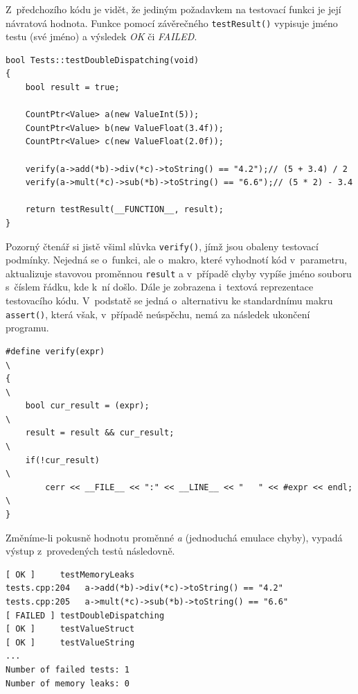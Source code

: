 \documentclass[11pt,twoside,a4paper]{book}
\begin{document}
Z~předchozího kódu je vidět, že jediným požadavkem na testovací funkci je její návratová hodnota. Funkce pomocí závěrečného \texttt{testResult()} vypisuje jméno testu (své jméno) a výsledek \textit{OK} či \textit{FAILED}.

\begin{verbatim}
bool Tests::testDoubleDispatching(void)
{
    bool result = true;

    CountPtr<Value> a(new ValueInt(5));
    CountPtr<Value> b(new ValueFloat(3.4f));
    CountPtr<Value> c(new ValueFloat(2.0f));

    verify(a->add(*b)->div(*c)->toString() == "4.2");// (5 + 3.4) / 2
    verify(a->mult(*c)->sub(*b)->toString() == "6.6");// (5 * 2) - 3.4

    return testResult(__FUNCTION__, result);
}
\end{verbatim}

Pozorný čtenář si jistě všiml slůvka \texttt{verify()}, jímž jsou obaleny testovací podmínky. Nejedná se o~funkci, ale o~makro, které vyhodnotí kód v~parametru, aktualizuje stavovou proměnnou \texttt{result} a v~případě chyby vypíše jméno souboru s~číslem řádku, kde k~ní došlo. Dále je zobrazena i~textová reprezentace testovacího kódu. V~podstatě se jedná o~alternativu ke standardnímu makru \texttt{assert()}, která však, v~případě neúspěchu, nemá za následek ukončení programu.

\begin{verbatim}
#define verify(expr)                                                   \
{                                                                      \
    bool cur_result = (expr);                                          \
    result = result && cur_result;                                     \
    if(!cur_result)                                                    \
        cerr << __FILE__ << ":" << __LINE__ << "   " << #expr << endl; \
}
\end{verbatim}

Změníme-li pokusně hodnotu proměnné \textit{a} (jednoduchá emulace chyby), vypadá výstup z~provedených testů ná\-sle\-dov\-ně.

\begin{verbatim}
[ OK ]     testMemoryLeaks
tests.cpp:204   a->add(*b)->div(*c)->toString() == "4.2"
tests.cpp:205   a->mult(*c)->sub(*b)->toString() == "6.6"
[ FAILED ] testDoubleDispatching
[ OK ]     testValueStruct
[ OK ]     testValueString
...
Number of failed tests: 1
Number of memory leaks: 0
\end{verbatim}
\end{document}
